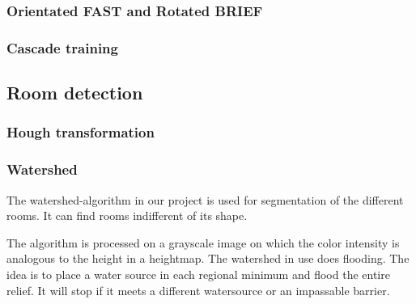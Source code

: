 \subsubsection{Orientated FAST and Rotated BRIEF}
\subsubsection{Cascade training}
\subsection{Room detection}
\subsubsection{Hough transformation}
\subsubsection{Watershed}
The watershed-algorithm in our project is used for segmentation of the different rooms. It can find rooms indifferent of its shape.

The algorithm is processed on a grayscale image on which the color intensity is analogous to the height in a heightmap. The watershed in use does flooding. The idea is to place a water source in each regional minimum and flood the entire relief. It will stop if it meets a different watersource or an impassable barrier.
